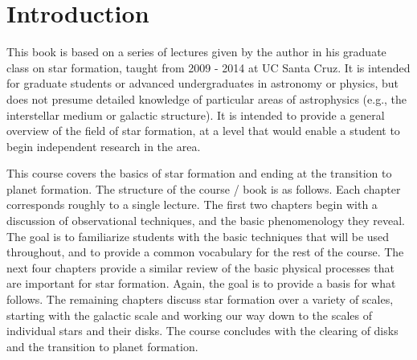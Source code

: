 \documentclass{tufte-book} %
\begin{document}
\listoftables %




\cleardoublepage
\chapter*{Introduction} %

This book is based on a series of lectures given by the author in his graduate class on star formation, taught from 2009 - 2014 at UC Santa Cruz. It is intended for graduate students or advanced undergraduates in astronomy or physics, but does not presume detailed knowledge of particular areas of astrophysics (e.g., the interstellar medium or galactic structure). It is intended to provide a general overview of the field of star formation, at a level that would enable a student to begin independent research in the area.

This course covers the basics of star formation and ending at the transition to planet formation. The structure of the course / book is as follows. Each chapter corresponds roughly to a single lecture. The first two chapters begin with a discussion of observational techniques, and the basic phenomenology they reveal. The goal is to familiarize students with the basic techniques that will be used throughout, and to provide a common vocabulary for the rest of the course. The next four chapters provide a similar review of the basic physical processes that are important for star formation. Again, the goal is to provide a basis for what follows. The remaining chapters discuss star formation over a variety of scales, starting with the galactic scale and working our way down to the scales of individual stars and their disks. The course concludes with the clearing of disks and the transition to planet formation.
\end{document}

